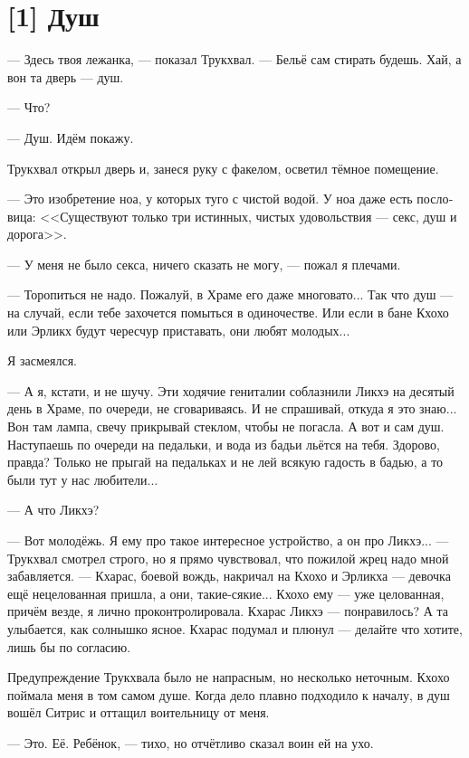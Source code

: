 \documentclass[a4paper,12pt,fleqn]{book}\usepackage{polyglossia}\setdefaultlanguage[babelshorthands=true]{russian}\setotherlanguage{english}\defaultfontfeatures{Ligatures=TeX,Mapping=tex-text}\usepackage{xcolor}\newcommand{\ml}[3]{#2}
\newcommand{\asterism}{\vspace{1em}{\centering\Large\bfseries$\ast~\ast~\ast$\par}\vspace{1em}}
\begin{document}
{\section{[1] Душ}

--- Здесь твоя лежанка, --- показал Трукхвал.
--- Бельё сам стирать будешь.
Хай, а вон та дверь --- душ.

--- Что?

--- Душ.
Идём покажу.

Трукхвал открыл дверь и, занеся руку с факелом, осветил тёмное помещение.

--- Это изобретение ноа, у которых туго с чистой водой.
У ноа даже есть пословица: <<Существуют только три истинных, чистых удовольствия --- секс, душ и дорога>>.

--- У меня не было секса, ничего сказать не могу, --- пожал я плечами.

--- Торопиться не надо.
Пожалуй, в Храме его даже многовато...
Так что душ --- на случай, если тебе захочется помыться в одиночестве.
Или если в бане Кхохо или Эрликх будут чересчур приставать, они любят молодых...

Я засмеялся.

--- А я, кстати, и не шучу.
Эти ходячие гениталии соблазнили Ликхэ на десятый день в Храме, по очереди, не сговариваясь.
И не спрашивай, откуда я это знаю...
Вон там лампа, свечу прикрывай стеклом, чтобы не погасла.
А вот и сам душ.
Наступаешь по очереди на педальки, и вода из бадьи льётся на тебя.
Здорово, правда?
Только не прыгай на педальках и не лей всякую гадость в бадью, а то были тут у нас любители...

--- А что Ликхэ?

--- Вот молодёжь.
Я ему про такое интересное устройство, а он про Ликхэ... --- Трукхвал смотрел строго, но я прямо чувствовал, что пожилой жрец надо мной забавляется.
--- Кхарас, боевой вождь, накричал на Кхохо и Эрликха --- девочка ещё нецелованная пришла, а они, такие-сякие...
Кхохо ему --- уже целованная, причём везде, я лично проконтролировала.
Кхарас Ликхэ --- понравилось?
А та улыбается, как солнышко ясное.
Кхарас подумал и плюнул --- делайте что хотите, лишь бы по согласию.

\asterism

Предупреждение Трукхвала было не напрасным, но несколько неточным.
Кхохо поймала меня в том самом душе.
Когда дело плавно подходило к началу, в душ вошёл Ситрис и оттащил воительницу от меня.

--- Это. Её. Ребёнок, --- тихо, но отчётливо сказал воин ей на ухо.

}
\end{document}
